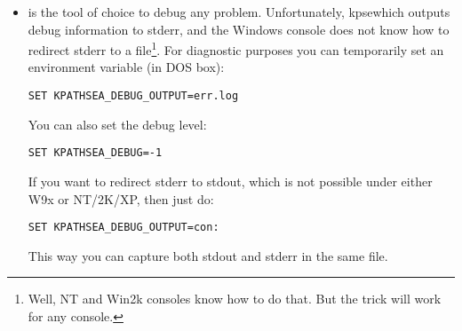 \documentclass{article}
\begin{document}
\begin{itemize}
\item {} is the tool of choice to debug any
problem.  Unfortunately, kpsewhich outputs debug information to
stderr, and the Windows console does not know how to redirect stderr
to a file\footnote{Well, NT and Win2k consoles know how to do
  that. But the trick will work for any console.}.  
For diagnostic purposes you can temporarily set an
environment variable (in DOS box):
\begin{verbatim}
SET KPATHSEA_DEBUG_OUTPUT=err.log
\end{verbatim}
You can also set the debug level: 
\begin{verbatim}
SET KPATHSEA_DEBUG=-1
\end{verbatim}

If you want to redirect stderr to stdout, which is not possible under
either W9x or NT/2K/XP, then just do:
\begin{verbatim}
SET KPATHSEA_DEBUG_OUTPUT=con:
\end{verbatim}
This way you can capture both stdout and stderr in the same file.


\end{itemize}
\end{document}
